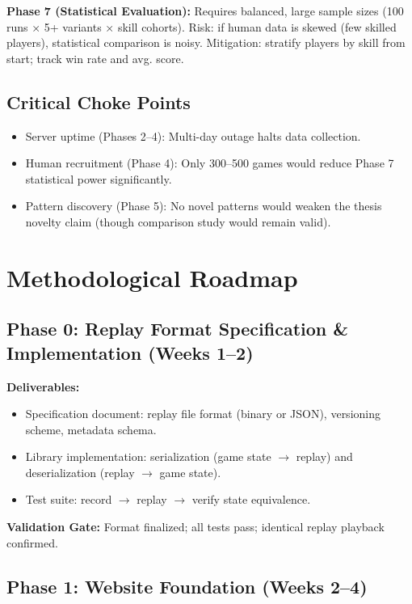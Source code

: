 \documentclass[a4paper]{article}
\begin{document}
\textbf{Phase 7 (Statistical Evaluation):} Requires balanced, large sample sizes (100 runs × 5+ variants × skill cohorts). Risk: if human data is skewed (few skilled players), statistical comparison is noisy. Mitigation: stratify players by skill from start; track win rate and avg. score.

\subsection{Critical Choke Points}

\begin{itemize}
\item Server uptime (Phases 2--4): Multi-day outage halts data collection.
\item Human recruitment (Phase 4): Only 300--500 games would reduce Phase 7 statistical power significantly.
\item Pattern discovery (Phase 5): No novel patterns would weaken the thesis novelty claim (though comparison study would remain valid).
\end{itemize}

\section{Methodological Roadmap}

\subsection{Phase 0: Replay Format Specification \& Implementation (Weeks 1--2)}

\textbf{Deliverables:} 
\begin{itemize}
\item Specification document: replay file format (binary or JSON), versioning scheme, metadata schema.
\item Library implementation: serialization (game state $\to$ replay) and deserialization (replay $\to$ game state).
\item Test suite: record $\to$ replay $\to$ verify state equivalence.
\end{itemize}

\textbf{Validation Gate:} Format finalized; all tests pass; identical replay playback confirmed.

\subsection{Phase 1: Website Foundation (Weeks 2--4)}
\end{document}
